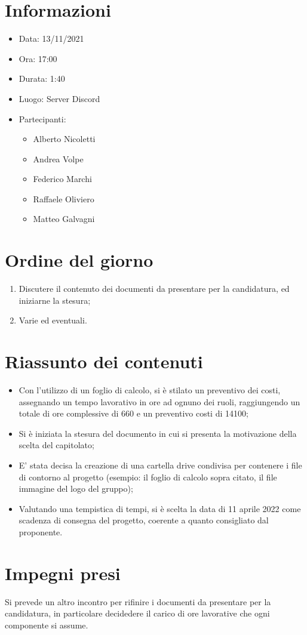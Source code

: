 \documentclass[a4paper, 12pt]{article}
\begin{document}
\makefrontpage

\section{Informazioni}

\begin{itemize}
\item Data: 13/11/2021
\item Ora: 17:00
\item Durata: 1:40
\item Luogo: Server Discord
\item Partecipanti: 
\begin{itemize}
\item Alberto Nicoletti
\item Andrea Volpe
\item Federico Marchi
\item Raffaele Oliviero
\item Matteo Galvagni
\end{itemize}
\end{itemize}

\section{Ordine del giorno}
\begin{enumerate}
\item Discutere il contenuto dei documenti da presentare per la candidatura, ed iniziarne la stesura;
\item Varie ed eventuali.
\end{enumerate}

\section{Riassunto dei contenuti}

\begin{itemize}
\item Con l'utilizzo di un foglio di calcolo, si è stilato un preventivo dei costi, assegnando un tempo lavorativo in ore ad ognuno dei ruoli, raggiungendo un totale di ore complessive di 660 e un preventivo costi di 14100;
\item Si è iniziata la stesura del documento in cui si presenta la motivazione della scelta del capitolato;
\item E' stata decisa la creazione di una cartella drive condivisa per contenere i file di contorno al progetto (esempio: il foglio di calcolo sopra citato, il file immagine del logo del gruppo);
\item Valutando una tempistica di tempi, si è scelta la data di 11 aprile 2022 come scadenza di consegna del progetto, coerente a quanto consigliato dal proponente.
\end{itemize}

\section{Impegni presi}
Si prevede un altro incontro per rifinire i documenti da presentare per la candidatura, in particolare decidedere il carico di ore lavorative che ogni componente si assume.
\end{document}

